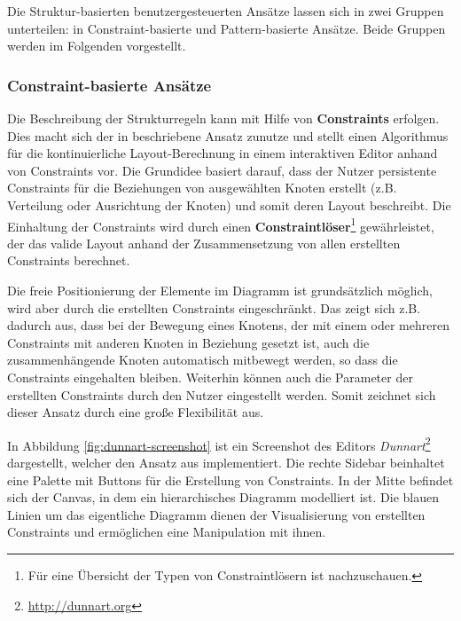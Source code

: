 Die Struktur-basierten benutzergesteuerten Ansätze lassen sich in zwei Gruppen unterteilen: in Constraint-basierte und Pattern-basierte Ansätze. Beide Gruppen werden im Folgenden vorgestellt.

\subsubsection{Constraint-basierte Ansätze}
\label{subsubsec:constraint-based-approaches}

Die Beschreibung der Strukturregeln kann mit Hilfe von \textbf{Constraints} erfolgen. Dies macht sich der in \cite{Wybrow08Using} beschriebene Ansatz zunutze und stellt einen Algorithmus für die kontinuierliche Layout-Berechnung in einem interaktiven Editor anhand von Constraints vor. Die Grundidee basiert darauf, dass der Nutzer persistente Constraints für die Beziehungen von ausgewählten Knoten erstellt (z.B. Verteilung oder Ausrichtung der Knoten) und somit deren Layout beschreibt. Die Einhaltung der Constraints wird durch einen \textbf{Constraintlöser}\footnote{Für eine Übersicht der Typen von Constraintlösern ist \cite[S.18ff]{Maier12A-Pattern-based} nachzuschauen.} gewährleistet, der das valide Layout anhand der Zusammensetzung von allen erstellten Constraints berechnet.

Die freie Positionierung der Elemente im Diagramm ist grundsätzlich 
möglich, wird aber durch die erstellten Constraints eingeschränkt. Das zeigt sich z.B. dadurch aus, dass bei der Bewegung eines Knotens, der mit einem oder mehreren Constraints mit anderen Knoten in Beziehung gesetzt ist, auch die zusammenhängende Knoten automatisch mitbewegt werden, so dass die Constraints eingehalten bleiben. Weiterhin können auch die Parameter der erstellten Constraints durch den Nutzer eingestellt werden. Somit zeichnet sich dieser Ansatz durch eine große Flexibilität aus.

In Abbildung \ref{fig:dunnart-screenshot} ist ein Screenshot des Editors \textit{Dunnart}\footnote{\url{http://dunnart.org}} dargestellt, welcher den Ansatz aus \cite{Wybrow08Using} implementiert. Die rechte Sidebar beinhaltet eine Palette mit Buttons für die Erstellung von Constraints. In der Mitte befindet sich der Canvas, in dem ein hierarchisches Diagramm modelliert ist. Die blauen Linien um das eigentliche Diagramm dienen der Visualisierung von erstellten Constraints und ermöglichen eine Manipulation mit ihnen.

